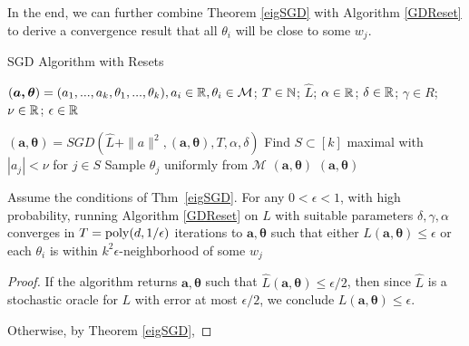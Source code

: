 

In the end, we can further combine Theorem \ref{eigSGD} with Algorithm \ref{GDReset} to derive a convergence result that all $\theta_i$ will be close to some $w_j$.
 
 \begin{algorithm}[tb]
 \caption{SGD Algorithm with Resets}
   \label{GDReset}
\begin{algorithmic}
  $(\boldsymbol{a,\theta}) = (a_1,...,a_k,\theta_1,...,\theta_k), a_i
  \in{\mathbb{R}}, \theta_i\in\mathcal{M}$;
  $T\in {\mathbb{N}}$; $\widehat{L}$; $\alpha\in {\mathbb{R}}$; $\delta \in {\mathbb{R}}$;
  $\gamma \in R$; $\nu \in {\mathbb{R}}$; $\epsilon \in {\mathbb{R}}$ \vspace{0.1in} 
  
   \REPEAT
  \STATE $(\boldsymbol{a},\boldsymbol{\theta}) = SGD \left(\widehat{L} + \|a\|^2, (\boldsymbol{a},\boldsymbol{\theta}),T, \alpha,\delta \right)$
  \STATE Find $S \subset [k]$ maximal with $|a_j| < \nu$ for $j \in S$
    \REPEAT \STATE Sample $\theta_j$
  uniformly from $\mathcal{M}$
    \ENDFOR
  \ELSE
   $(\boldsymbol{a}, \boldsymbol{\theta}) $
  \ENDIF
    $(\boldsymbol{a}, \boldsymbol{\theta}) $
   \end{algorithmic}
\end{algorithm}

\begin{corollary}
Assume the conditions of Thm~\ref{eigSGD}. For any $0 < \epsilon < 1$, with high probability, running Algorithm \ref{GDReset} on $L$ with suitable parameters $\delta, \gamma, \alpha$ converges in $T = \mathrm{poly}(d, 1/\epsilon)$ iterations to $\boldsymbol{a,\theta}$ such that either $L(\boldsymbol{a,\theta}) \leq \epsilon$ or each $\theta_i$ is within $k^2\epsilon$-neighborhood of some $w_j$
\end{corollary}

\begin{proof}
If the algorithm returns $\boldsymbol{a,\theta}$ such that $\widehat{L}(\boldsymbol{a,\theta}) \leq \epsilon/2$, then since $\widehat{L}$ is a stochastic oracle for $L$ with error at most $\epsilon/2$, we conclude $L(\boldsymbol{a,\theta}) \leq \epsilon$. 

Otherwise, by Theorem \ref{eigSGD}, 
\end{proof}

\fi









